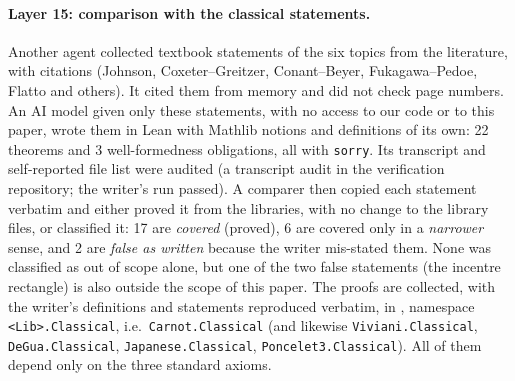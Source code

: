 \documentclass[11pt]{article}
\theoremstyle{definition}
\theoremstyle{remark}
\newcommand{\code}[1]{\texttt{#1}}
\begin{document}
\paragraph{Layer 15: comparison with the classical statements.}
Another agent collected textbook statements of the six topics from the literature, with citations
(Johnson, Coxeter--Greitzer, Conant--Beyer, Fukagawa--Pedoe, Flatto and others). It cited them from
memory and did not check page numbers. An AI model given only these statements, with no access to our
code or to this paper, wrote them in Lean with Mathlib notions and definitions of its own: 22 theorems
and 3 well-formedness obligations, all with \code{sorry}. Its transcript and self-reported file list
were audited (a transcript audit in the verification repository; the writer's run passed). A comparer then copied each statement verbatim and either proved it from the libraries,
with no change to the library files, or classified it: 17 are \emph{covered} (proved), 6 are covered
only in a \emph{narrower} sense, and 2 are \emph{false as written} because the writer mis-stated
them. None was classified as out of scope alone, but one of the two false statements (the incentre
rectangle) is also outside the scope of this paper. The proofs are collected, with the writer's
definitions and statements reproduced verbatim, in , namespace
\code{<Lib>.Classical}, i.e.\ \code{Carnot.Classical} (and likewise \code{Viviani.Classical}, \code{DeGua.Classical},
\code{Japanese.Classical}, \code{Poncelet3.Classical}). All of them depend only on the three standard
axioms.
\end{document}
